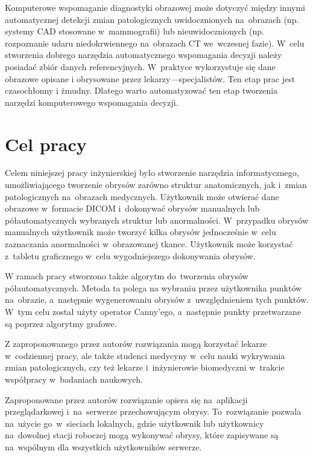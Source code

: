 \documentclass[a4paper,11pt,twoside,openright]{report}
\theoremstyle{definition}
\begin{document}
Komputerowe wspomaganie diagnostyki obrazowej może dotyczyć między innymi automatycznej
detekcji zmian patologicznych uwidocznionych na~obrazach (np. systemy CAD stosowane
w~mammografii) lub nieuwidocznionych (np. rozpoznanie udaru niedokrwiennego na~obrazach %
CT we~wczesnej fazie). W~celu stworzenia dobrego narzędzia automatycznego wspomagania %
decyzji należy posiadać zbiór danych referencyjnych. W~praktyce wykorzystuje się
dane obrazowe opisane i obrysowane przez lekarzy---specjalistów. Ten etap prac
jest czasochłonny i żmudny. Dlatego warto automatyzować ten etap tworzenia narzędzi
komputerowego wspomagania decyzji.

\section*{Cel pracy}

Celem niniejszej pracy inżynierskiej było stworzenie narzędzia informatycznego,
umożliwiającego tworzenie obrysów zarówno struktur anatomicznych, jak i~zmian patologicznych
na~obrazach medycznych. Użytkownik może otwierać
dane obrazowe w~formacie DICOM i~dokonywać obrysów manualnych lub półautomatycznych
wybranych struktur lub anormalności. W~przypadku obrysów manualnych użytkownik
może tworzyć kilka obrysów jednocześnie w~celu zaznaczania anormalności w~obrazowanej tkance.
Użytkownik może korzystać z~tabletu graficznego w~celu wygodniejszego dokonywania obrysów.

W ramach pracy stworzono także algorytm do~tworzenia obrysów półautomatycznych.
Metoda ta polega na wybraniu przez użytkownika punktów na~obrazie, a~następnie
wygenerowaniu obrysów z~uwzględnieniem tych punktów. W~tym celu
został użyty operator Canny'ego, a~następnie punkty przetwarzane są
poprzez algorytmy grafowe.

Z zaproponowanego przez autorów rozwiązania mogą korzystać lekarze w~codziennej pracy, ale także
studenci medycyny w~celu nauki wykrywania zmian patologicznych, czy też lekarze i~inżynierowie
biomedyczni w~trakcie współpracy w~badaniach naukowych.

Zaproponowane przez autorów rozwiązanie opiera się na~aplikacji przeglądarkowej
i~na~serwerze przechowującym obrysy. To~rozwiązanie pozwala na~użycie go~w~sieciach
lokalnych, gdzie użytkownik lub użytkownicy na~dowolnej stacji roboczej mogą
wykonywać obrysy, które zapisywane są na~wspólnym dla wszystkich użytkowników serwerze.
\end{document}
